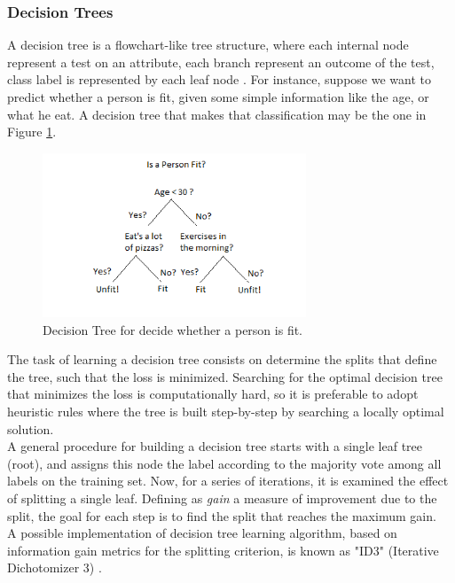 \subsubsection{Decision Trees}
A decision tree is a flowchart-like tree structure, where each internal node represent a test on an attribute, each branch represent an outcome of the test, class label is represented by each leaf node \cite{article-decisiontrees}. For instance, suppose we want to predict whether a person is fit, given some simple information like the age, or what he eat. A decision tree that makes that classification may be the one in Figure \ref{fig:decision-tree}.

\begin{figure}[ht]
	\centering
	\includegraphics[width=0.7\textwidth]{figures/decision-tree.png}
	\caption{Decision Tree for decide whether a person is fit.}
	\label{fig:decision-tree}
\end{figure}

The task of learning a decision tree consists on determine the splits that define the tree, such that the loss is minimized. Searching for the optimal decision tree that minimizes the loss is computationally hard, so it is preferable to adopt heuristic rules where the tree is built step-by-step by searching a locally optimal solution. \\
A general procedure for building a decision tree starts with a single leaf tree (root), and assigns this node the label according to the majority vote among all labels on the training set. Now, for a series of iterations, it is examined the effect of splitting a single leaf. Defining as \textit{gain} a measure of improvement due to the split, the goal for each step is to find the split that reaches the maximum gain.\\
A possible implementation of decision tree learning algorithm, based on information gain metrics for the splitting criterion, is known as "ID3" (Iterative Dichotomizer 3) \cite{inproceedings-id3}. 





